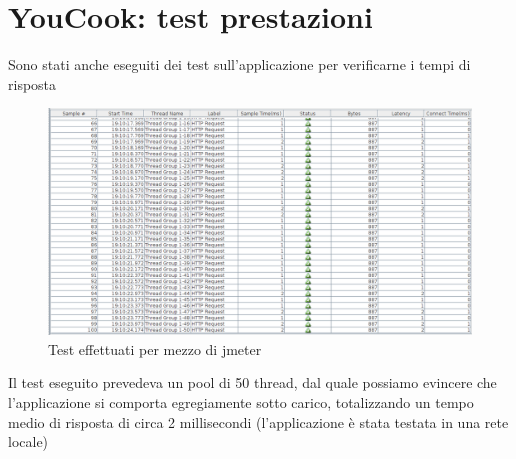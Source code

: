 \section{YouCook: test prestazioni}
Sono stati anche eseguiti dei test sull'applicazione per verificarne i tempi di risposta
\begin{figure}[H]
    \centering
 \includegraphics[scale=0.4]{resources/tests.png}
   \caption{Test effettuati per mezzo di jmeter}
\end{figure}
Il test eseguito prevedeva un pool di 50 thread, dal quale possiamo evincere che l'applicazione si comporta egregiamente sotto carico, totalizzando un tempo medio di risposta di circa 2 millisecondi (l'applicazione è stata testata in una rete locale)
